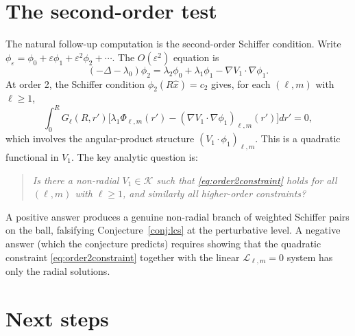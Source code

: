 \documentclass[11pt]{article}
\newcommand{\eps}{\varepsilon}
\newcommand{\1}{\mathbf 1}
\begin{document}
\section{The second-order test}

The natural follow-up computation is the second-order Schiffer
condition. Write $\phi_\eps=\phi_0+\eps\phi_1+\eps^2\phi_2+\cdots$.
The $O(\eps^2)$ equation is
\begin{equation}\label{eq:order2eqn}
    (-\Delta-\lambda_0)\phi_2
    =\lambda_2\phi_0+\lambda_1\phi_1-\nabla V_1\cdot\nabla\phi_1.
\end{equation}
At order 2, the Schiffer condition $\phi_2(R\hat x)=c_2$ gives, for
each $(\ell,m)$ with $\ell\ge 1$,
\begin{equation}\label{eq:order2constraint}
    \int_0^R G_\ell(R,r')\bigl[\lambda_1\Phi_{\ell,m}(r')
        -(\nabla V_1\cdot\nabla\phi_1)_{\ell,m}(r')\bigr]dr' = 0,
\end{equation}
which involves the angular-product structure
$(V_1\cdot\phi_1)_{\ell,m}$. This is a quadratic functional in
$V_1$. The key analytic question is:

\begin{quote}
\emph{Is there a non-radial $V_1\in\mathcal{K}$ such that
\eqref{eq:order2constraint} holds for all $(\ell,m)$ with $\ell\ge
1$, and similarly all higher-order constraints?}
\end{quote}

A positive answer produces a genuine non-radial branch of weighted
Schiffer pairs on the ball, falsifying Conjecture~\ref{conj:lcs} at
the perturbative level. A negative answer (which the conjecture
predicts) requires showing that the quadratic constraint
\eqref{eq:order2constraint} together with the linear
$\mathcal{L}_{\ell,m}=0$ system has only the radial solutions.

\section{Next steps}
\end{document}
